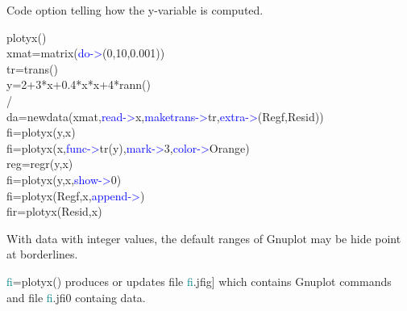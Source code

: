 \begin{changemargin}{3cm}{0cm}
\noindent   Code option telling how the y-variable is computed.
\end {changemargin}
\hline
\vspace{0.2cm}
\begin{example}[plotyxex]plotyx()\\
\label{plotyxex}
xmat=\textcolor{VioletRed}{matrix}(\textcolor{blue}{do->}(0,10,0.001))\\
tr=\textcolor{VioletRed}{trans}()\\
y=2+3*x+0.4*x*x+4*rann()\\
/\\
da=\textcolor{VioletRed}{newdata}(xmat,\textcolor{blue}{read->}x,\textcolor{blue}{maketrans->}tr,\textcolor{blue}{extra->}(Regf,Resid))\\
fi=\textcolor{VioletRed}{plotyx}(y,x)\\
fi=\textcolor{VioletRed}{plotyx}(x,\textcolor{blue}{func->}tr(y),\textcolor{blue}{mark->}3,\textcolor{blue}{color->}Orange)\\
reg=\textcolor{VioletRed}{regr}(y,x)\\
fi=\textcolor{VioletRed}{plotyx}(y,x,\textcolor{blue}{show->}0)\\
fi=\textcolor{VioletRed}{plotyx}(Regf,x,\textcolor{blue}{append->})\\
fir=\textcolor{VioletRed}{plotyx}(Resid,x)
\end{example}
\begin{note}
With data with integer values, the default ranges of Gnuplot may be hide point at
borderlines.
\end{note}
\begin{note}
\textcolor{teal}{fi}=\textcolor{VioletRed}{plotyx}() produces or updates file \textcolor{teal}{fi}.jfig] which contains
Gnuplot commands and file \textcolor{teal}{fi}.jfi0 containg data.
\end{note}
